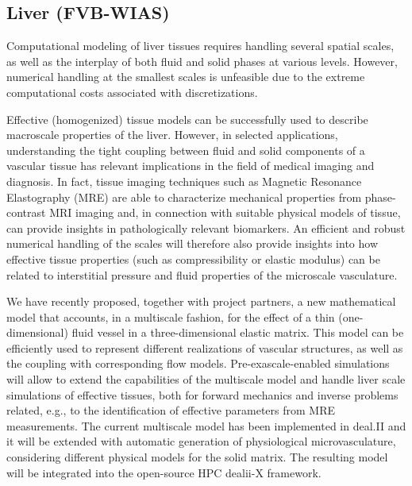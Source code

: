 \documentclass[a4paper,12pt]{article}
\begin{document}
\subsection{Liver (FVB-WIAS)}
Computational modeling of liver tissues requires handling several spatial scales, as well as the interplay of both fluid and solid phases at various levels.
However, numerical handling at the smallest scales is unfeasible due to the extreme computational costs associated with discretizations.

Effective (homogenized) tissue models can be successfully used to describe macroscale properties of the liver.
However, in selected applications, understanding the tight coupling between fluid and solid components of a vascular tissue has relevant implications in the field of medical imaging and diagnosis.
In fact, tissue imaging techniques such as Magnetic Resonance Elastography (MRE) are able to characterize mechanical properties from phase-contrast MRI imaging and, in connection with suitable physical models of tissue, can provide insights in pathologically relevant biomarkers.
An efficient and robust numerical handling of the scales will therefore also provide insights into how effective tissue properties (such as compressibility or elastic modulus) can be related to interstitial pressure and fluid properties of the microscale vasculature.

We have recently proposed, together with project partners, a new mathematical model that accounts, in a multiscale fashion, for the effect of a thin (one-dimensional) fluid vessel in a three-dimensional elastic matrix.
This model can be efficiently used to represent different realizations of vascular structures, as well as the coupling with corresponding flow models.
Pre-exascale-enabled simulations will allow to extend the capabilities of the multiscale model and handle liver scale simulations of effective tissues, both for forward mechanics and inverse problems related, e.g., to the identification of effective parameters from MRE measurements.
The current multiscale model has been implemented in deal.II and it will be extended with automatic generation of physiological microvasculature, considering different physical models for the solid matrix.
The resulting model will be integrated into the open-source HPC dealii-X framework.
\end{document}
